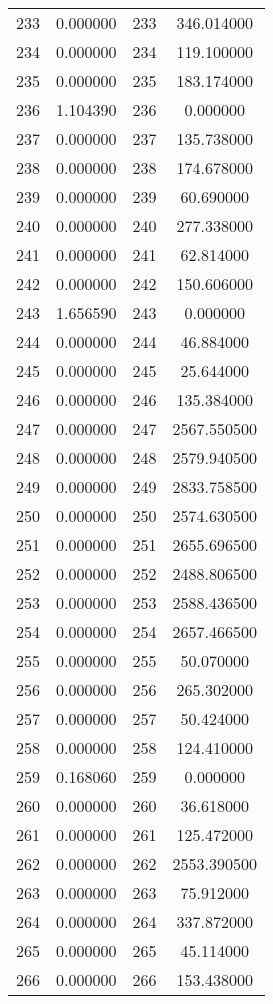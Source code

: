\documentclass[12pt]{article}
\begin{document}
\begin{longtable}{@{}cccc@{}}
233 & 0.000000 & 233 & 346.014000 \\
234 & 0.000000 & 234 & 119.100000 \\
235 & 0.000000 & 235 & 183.174000 \\
236 & 1.104390 & 236 & 0.000000 \\
237 & 0.000000 & 237 & 135.738000 \\
238 & 0.000000 & 238 & 174.678000 \\
239 & 0.000000 & 239 & 60.690000 \\
240 & 0.000000 & 240 & 277.338000 \\
241 & 0.000000 & 241 & 62.814000 \\
242 & 0.000000 & 242 & 150.606000 \\
243 & 1.656590 & 243 & 0.000000 \\
244 & 0.000000 & 244 & 46.884000 \\
245 & 0.000000 & 245 & 25.644000 \\
246 & 0.000000 & 246 & 135.384000 \\
247 & 0.000000 & 247 & 2567.550500 \\
248 & 0.000000 & 248 & 2579.940500 \\
249 & 0.000000 & 249 & 2833.758500 \\
250 & 0.000000 & 250 & 2574.630500 \\
251 & 0.000000 & 251 & 2655.696500 \\
252 & 0.000000 & 252 & 2488.806500 \\
253 & 0.000000 & 253 & 2588.436500 \\
254 & 0.000000 & 254 & 2657.466500 \\
255 & 0.000000 & 255 & 50.070000 \\
256 & 0.000000 & 256 & 265.302000 \\
257 & 0.000000 & 257 & 50.424000 \\
258 & 0.000000 & 258 & 124.410000 \\
259 & 0.168060 & 259 & 0.000000 \\
260 & 0.000000 & 260 & 36.618000 \\
261 & 0.000000 & 261 & 125.472000 \\
262 & 0.000000 & 262 & 2553.390500 \\
263 & 0.000000 & 263 & 75.912000 \\
264 & 0.000000 & 264 & 337.872000 \\
265 & 0.000000 & 265 & 45.114000 \\
266 & 0.000000 & 266 & 153.438000 \\

\end{longtable}
\end{document}
